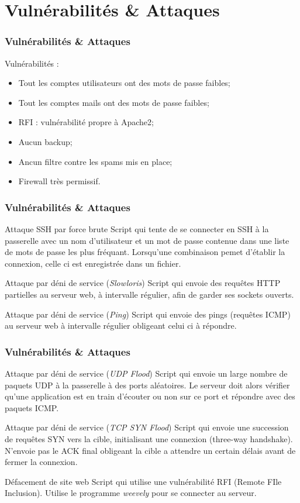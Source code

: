 \documentclass{beamer}
\begin{document}
	\section{Vulnérabilités \& Attaques}
		\begin{frame}
			\frametitle{Vulnérabilités \& Attaques}
			Vulnérabilités :
			\begin{itemize}
				\item Tout les comptes utilisateurs ont des mots de passe faibles;
				\item Tout les comptes mails ont des mots de passe faibles;
				\item RFI : vulnérabilité propre à Apache2;
				\item Aucun backup;
				\item Ancun filtre contre les spams mis en place;
				\item Firewall très permissif.
			\end{itemize}
		\end{frame}
		\begin{frame}
			\frametitle{Vulnérabilités \& Attaques}
			\begin{block}{Attaque SSH par force brute}
				Script qui tente de se connecter en SSH à la passerelle avec un nom d'utilisateur et un mot de passe contenue dans une liste de mots de passe les plus fréquant.
				Lorsqu'une combinaison pemet d'établir la connexion, celle ci est enregistrée dans un fichier.
			\end{block}
			\begin{block}{Attaque par déni de service (\textit{Slowloris})}
				Script qui envoie des requêtes HTTP partielles au serveur web, à intervalle régulier, afin de garder ses sockets ouverts.
			\end{block}
			\begin{block}{Attaque par déni de service (\textit{Ping})}
				Script qui envoie des pings (requêtes ICMP) au serveur web à intervalle régulier obligeant celui ci à répondre.
			\end{block}
		\end{frame}
		\begin{frame}
			\frametitle{Vulnérabilités \& Attaques}
			\begin{block}{Attaque par déni de service (\textit{UDP Flood})}
				Script qui envoie un large nombre de paquets UDP à la passerelle à des ports aléatoires.
				Le serveur doit alors vérifier qu'une application est en train d'écouter ou non sur ce port et répondre avec des paquets ICMP.
			\end{block}
			\begin{block}{Attaque par déni de service (\textit{TCP SYN Flood})}
				Script qui envoie une succession de requêtes SYN vers la cible, initialisant une connexion (three-way handshake).
				N'envoie pas le ACK final obligeant la cible a attendre un certain délais avant de fermer la connexion.
			\end{block}
			\begin{block}{Défacement de site web}
				Script qui utilise une vulnérabilité RFI (Remote FIle Inclusion). Utilise le programme \textit{weevely} pour se connecter au serveur.
			\end{block}
		\end{frame}
\end{document}
